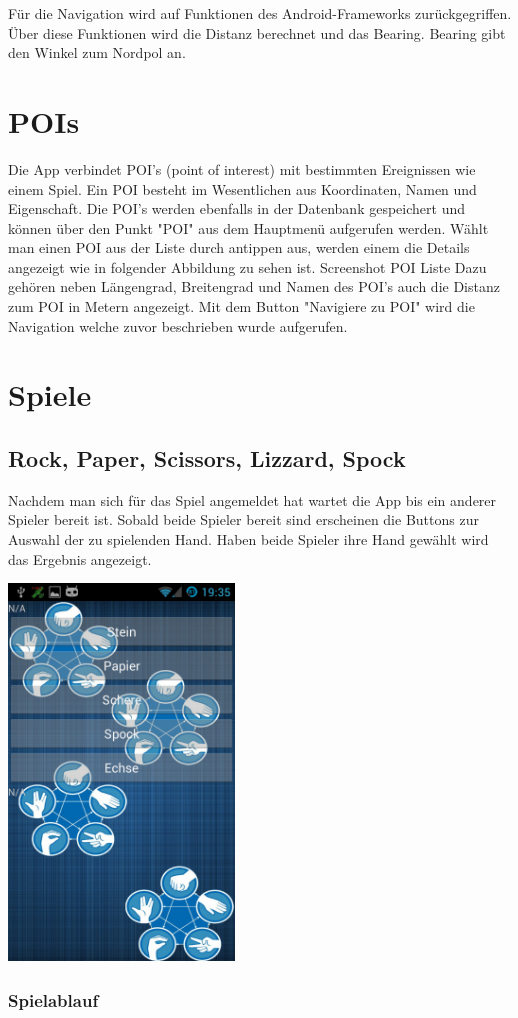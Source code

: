 Für die Navigation wird auf Funktionen des Android-Frameworks zurückgegriffen. Über diese Funktionen wird die Distanz berechnet und das Bearing. Bearing gibt den Winkel zum Nordpol an.

\section{POIs}
Die App verbindet POI's (point of interest)  mit bestimmten Ereignissen wie einem Spiel. Ein POI besteht im Wesentlichen aus Koordinaten, Namen und Eigenschaft.  Die POI's werden ebenfalls in der Datenbank gespeichert und können über den Punkt "POI" aus dem Hauptmenü aufgerufen werden. Wählt man einen POI aus der Liste durch antippen aus, werden einem die Details angezeigt wie in folgender Abbildung zu sehen ist.
\TODO Screenshot POI Liste
Dazu gehören neben Längengrad, Breitengrad und Namen des POI's auch die Distanz zum POI in Metern angezeigt. Mit dem Button "Navigiere zu POI" wird die Navigation welche zuvor beschrieben wurde aufgerufen.

\section{Spiele}


\subsection{Rock, Paper, Scissors, Lizzard, Spock}
Nachdem man sich für das Spiel angemeldet hat wartet die App bis ein anderer Spieler bereit ist. Sobald beide Spieler bereit sind erscheinen die Buttons zur Auswahl der zu spielenden Hand. Haben beide Spieler ihre Hand gewählt wird das Ergebnis angezeigt.

\begin{capfigure}
	\includegraphics[width=6cm]{images/app/rpssl}
\end{capfigure}



\subsubsection{Spielablauf}


